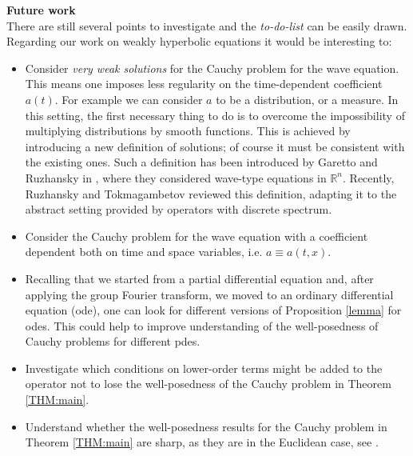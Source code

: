 \documentclass[12pt,oneside,a4paper]{book}
\numberwithin{equation}{section}     %
\theoremstyle{plain}
\theoremstyle{definition}
\newcommand{\R}{{\mathbb R}}
\newcommand{\Rn}{{\R}^n}
\begin{document}
\textbf{Future work}\\
There are still several points to investigate and the \textit{to-do-list} can be easily drawn. Regarding our work on weakly hyperbolic equations it would be interesting to:
\begin{itemize}
	\item Consider \textit{very weak solutions}  for the Cauchy problem for the wave equation. This means one imposes less regularity on the time-dependent coefficient $a(t)$. For example we can consider $a$ to be a distribution, or a measure. In this setting, the first necessary thing to do is to overcome the impossibility of multiplying distributions by smooth functions. This is achieved by introducing a new definition of solutions; of course it must be consistent with the existing ones. Such a definition has been introduced by Garetto and Ruzhansky in \cite{Garetto-Ruzhansky:ARMA}, where they considered wave-type equations in $\Rn$. Recently, Ruzhansky and Tokmagambetov \cite{RTok2017} reviewed this definition, adapting it to the abstract setting provided by operators with discrete spectrum.
	
	\item Consider the Cauchy problem for the wave equation with a coefficient dependent both on time and space variables, i.e. $a\equiv a(t,x)$.
	
	\item Recalling that we started from a partial differential equation and, after applying the group Fourier transform, we moved to an ordinary differential equation (ode), one can look for different versions of Proposition \ref{lemma} for odes. This could help to improve understanding of the well-posedness of Cauchy problems for different pdes.
	
	\item Investigate which conditions on lower-order terms might be added to the operator not to lose the well-posedness of the Cauchy problem in Theorem \ref{THM:main}.
	
	\item Understand whether the well-posedness results for the Cauchy problem in Theorem \ref{THM:main} are sharp, as they are in the Euclidean case, see \cite{CDS79}.
	
\end{itemize}
\end{document}
